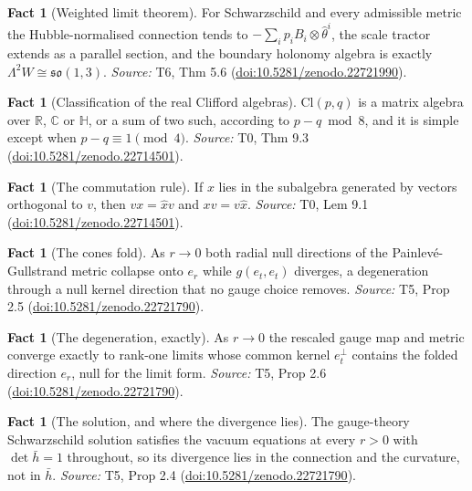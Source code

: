 \documentclass[11pt]{article}
\theoremstyle{definition}
\newtheorem{fact}[theorem]{Fact}
\theoremstyle{plain}
\providecommand{\C}{}\renewcommand{\C}{\mathbb{C}}
\providecommand{\Cl}{}\renewcommand{\Cl}{\mathrm{Cl}}
\providecommand{\HH}{}\renewcommand{\HH}{\mathbb{H}}
\providecommand{\R}{}\renewcommand{\R}{\mathbb{R}}
\providecommand{\er}{}\renewcommand{\er}{e_r}
\providecommand{\et}{}\renewcommand{\et}{e_t}
\providecommand{\hb}{}\renewcommand{\hb}{\bar{h}}
\begin{document}
\begin{fact}[Weighted limit theorem]\label{c:interior.weighted-limit-theorem}
For Schwarzschild and every admissible metric the Hubble-normalised connection tends to $-\sum_i p_i B_i \otimes \hat\theta^i$, the scale tractor extends as a parallel section, and the boundary holonomy algebra is exactly $\Lambda^2 W \cong \mathfrak{so}(1,3)$.
\emph{Source:} T6, Thm 5.6 (\href{https://doi.org/10.5281/zenodo.22721990}{doi:10.5281/zenodo.22721990}).
\end{fact}

\begin{fact}[Classification of the real Clifford algebras]\label{c:primer.classification-real-clifford-algebras}
$\Cl(p,q)$ is a matrix algebra over $\R$, $\C$ or $\HH$, or a sum of two such, according to $p - q \bmod 8$, and it is simple except when $p - q \equiv 1 \pmod 4$.
\emph{Source:} T0, Thm 9.3 (\href{https://doi.org/10.5281/zenodo.22714501}{doi:10.5281/zenodo.22714501}).
\end{fact}

\begin{fact}[The commutation rule]\label{c:primer.commutation-rule}
If $x$ lies in the subalgebra generated by vectors orthogonal to $v$, then $v x = \hat{x} v$ and $x v = v \hat{x}$.
\emph{Source:} T0, Lem 9.1 (\href{https://doi.org/10.5281/zenodo.22714501}{doi:10.5281/zenodo.22714501}).
\end{fact}

\begin{fact}[The cones fold]\label{c:singularity.cones-fold}
As $r \to 0$ both radial null directions of the Painlev\'e-Gullstrand metric collapse onto $\er$ while $g(\et,\et)$ diverges, a degeneration through a null kernel direction that no gauge choice removes.
\emph{Source:} T5, Prop 2.5 (\href{https://doi.org/10.5281/zenodo.22721790}{doi:10.5281/zenodo.22721790}).
\end{fact}

\begin{fact}[The degeneration, exactly]\label{c:singularity.degeneration-exactly}
As $r \to 0$ the rescaled gauge map and metric converge exactly to rank-one limits whose common kernel $\et^{\perp}$ contains the folded direction $\er$, null for the limit form.
\emph{Source:} T5, Prop 2.6 (\href{https://doi.org/10.5281/zenodo.22721790}{doi:10.5281/zenodo.22721790}).
\end{fact}

\begin{fact}[The solution, and where the divergence lies]\label{c:singularity.solution-where-divergence-lies}
The gauge-theory Schwarzschild solution satisfies the vacuum equations at every $r > 0$ with $\det \hb = 1$ throughout, so its divergence lies in the connection and the curvature, not in $\hb$.
\emph{Source:} T5, Prop 2.4 (\href{https://doi.org/10.5281/zenodo.22721790}{doi:10.5281/zenodo.22721790}).
\end{fact}
\end{document}
